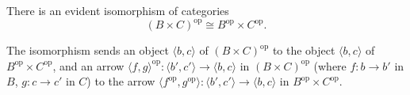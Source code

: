 There is an evident isomorphism of categories
$$(B \times C)^{\text{op}} \cong B^{\text{op}} \times C^{\text{op}}.$$

The isomorphism sends an object $\langle b, c \rangle$ of $(B \times C)^{\text{op}}$ to the object $\langle b, c \rangle$ of $B^{\text{op}} \times C^{\text{op}}$, and an arrow $\langle f, g \rangle^{\text{op}}: \langle b', c' \rangle \to \langle b, c \rangle$ in $(B \times C)^{\text{op}}$ (where $f: b \to b'$ in $B$, $g: c \to c'$ in $C$) to the arrow $\langle f^{\text{op}}, g^{\text{op}} \rangle: \langle b', c' \rangle \to \langle b, c \rangle$ in $B^{\text{op}} \times C^{\text{op}}$.
